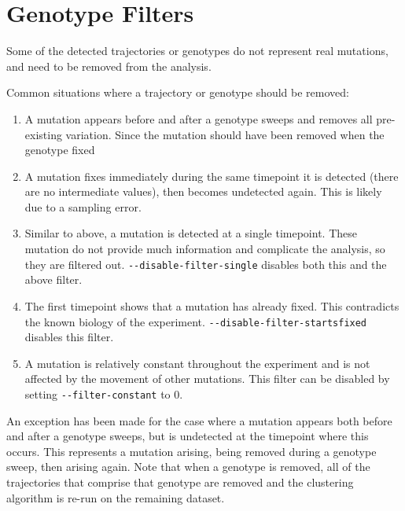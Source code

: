 \documentclass{report}
\begin{document}
\chapter{Genotype Filters}
Some of the detected trajectories or genotypes do not represent real mutations, and need to be removed from the analysis. 

Common situations where a trajectory or genotype should be removed:

\begin{enumerate}
\item A mutation appears before and after a genotype sweeps and removes all pre-existing variation. 
        Since the mutation should have been removed when the genotype fixed
\item A mutation fixes immediately during the same timepoint it is detected (there are no intermediate values), then becomes undetected again.
        This is likely due to a sampling error.
\item Similar to above, a mutation is detected at a single timepoint. 
        These mutation do not provide much information and complicate the analysis, so they are filtered out.
        \verb|--disable-filter-single| disables both this and the above filter.
\item The first timepoint shows that a mutation has already fixed. 
        This contradicts the known biology of the experiment.
        \verb|--disable-filter-startsfixed| disables this filter.
\item A mutation is relatively constant throughout the experiment and is not affected by the movement of other mutations.
        This filter can be disabled by setting \verb|--filter-constant| to 0.
\end{enumerate}

An exception has been made for the case where a mutation appears both before and after a genotype sweeps, but is undetected at the timepoint where this occurs. 
This represents a mutation arising, being removed during a genotype sweep, then arising again.
Note that when a genotype is removed, all of the trajectories that comprise that genotype are removed and the clustering algorithm is re-run on the remaining dataset. 
\end{document}
